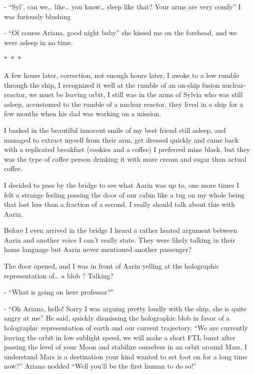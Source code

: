 \documentclass[colorlinks,12pt,a4paper]{book}
\newcommand\sep{\begin{center}
  \boldmath $\ast$~$\ast$~$\ast$
\end{center}}
\begin{document}
- “Syl', can we… like… you know… sleep like that? Your arms are very comfy” I was furiously blushing\par
\bigskip
- “Of course Ariana, good night baby” she kissed me on the forehead, and we were asleep in no time.

\sep

A few hours later, correction, not enough hours later, I awoke to a low rumble through the ship, 
I recognized it well at the rumble of an on-ship fusion nuclear-reactor, we must be leaving orbit, 
I still was in the arms of Sylvia who was still asleep, accustomed to the rumble of a nuclear reactor, 
they lived in a ship for a few months when his dad was working on a mission.\par
\bigskip

I basked in the beautiful innocent smile of my best friend still asleep, and managed to extract myself 
from their arm, get dressed quickly and came back with a replicated breakfast (cookies and a coffee) I preferred mine 
black, but they was the type of coffee person drinking it with more cream and sugar than actual coffee.\par
\bigskip

I decided to pass by the bridge to see what Aarin was up to, one more times I felt a strange feeling passing 
the door of our cabin like a tug on my whole being that last less than a fraction of a second. 
I really should talk about this with Aarin. \par
\bigskip

Before I even arrived in the bridge I heard a rather heated argument between Aarin and another voice I can't really state. 
They were likely talking in their home language but Aarin never mentioned another passenger?\par
\bigskip

The door opened, and I was in front of Aarin yelling at the holographic representation of… a blob ? Talking?\par
\bigskip

- “What is going on here professor?”\par
\bigskip
- “Oh Ariana, hello! Sorry I was arguing pretty loudly with the ship, she is quite angry at me” He said, 
quickly dismissing the holographic blob in favor of a holographic representation of earth and our current trajectory. 
“We are currently leaving the orbit in low sublight speed, we will make a short FTL burst after passing the level of 
your Moon and stabilize ourselves in an orbit around Mars, I understand Mars is a destination your kind wanted 
to set foot on for a long time now?” Ariana nodded “Well you'll be the first human to do so!”\par
\bigskip
\end{document}
